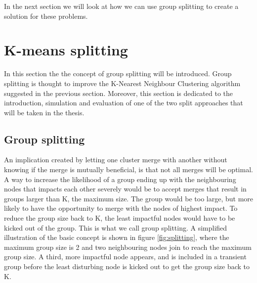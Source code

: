 In the next section we will look at how we can use group splitting to create a solution for these problems. 


\section{K-means splitting}
In this section the the concept of group splitting will be introduced. Group splitting is thought to improve the K-Nearest Neighbour Clustering algorithm suggested in the previous section.
Moreover, this section is dedicated to the introduction, simulation and evaluation of one of the two split approaches that will be taken in the thesis.

\subsection{Group splitting}
An implication created by letting one cluster merge with another without knowing if the merge is mutually beneficial, is that not all merges will be optimal.
A way to increase the likelihood of a group ending up with the neighbouring nodes that impacts each other severely would be to accept merges that result in groups larger than K, the maximum size. 
The group would be too large, but more likely to have the opportunity to merge with the nodes of highest impact. To reduce the group size back to K,
the least impactful nodes would have to be kicked out of the group. This is what we call group splitting. A simplified illustration of the basic concept is shown in figure \ref{fig:splitting},
where the maximum group size is 2 and two neighbouring nodes join to reach the maximum group size. A third, more impactful node appears, and is included in a transient group
before the least disturbing node is kicked out to get the group size back to K. 

